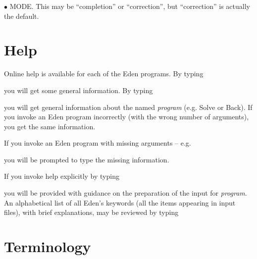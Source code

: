 \documentclass{report}
\begin{document}
$\bullet$ MODE. 
This may be ``completion'' or ``correction'', but ``correction'' is actually the default.


\section{Help}
\label{general-help}

Online help is available for each of the Eden programs.
By typing 


you will get some general information.  By typing


you will get general information about the named {\it program}
(e.g. Solve or Back).  
If you invoke an Eden program incorrectly
(with the wrong number of arguments), you get
the same information.  

If you invoke an Eden program with missing arguments -- e.g.


you will be prompted to type the missing information.


If you invoke help explicitly by typing


you will be provided with guidance on the preparation of the input 
for {\it program}. An alphabetical list
of all Eden's keywords (all the items appearing in input files),
with brief explanations, may be reviewed by typing



\section{Terminology}
\label{general-terminology}
\end{document}
